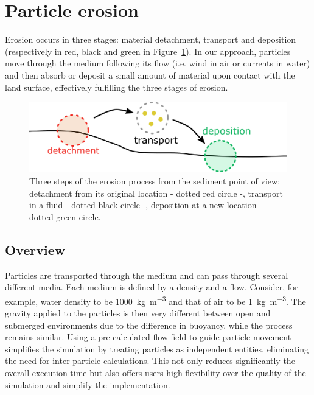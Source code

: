 \section{Particle erosion}%
\label{sec:method}
Erosion occurs in three stages: material detachment, transport and deposition (respectively in red, black and green in Figure~\ref{Erosion-fig:ablation_erosion}). In our approach, particles move through the medium following its flow (i.e. wind in air or currents in water) and then absorb or deposit a small amount of material upon contact with the land surface, effectively fulfilling the three stages of erosion.
\begin{figure}[ht]
\centering
\includegraphics[width=0.95\linewidth]{figures/ablation_erosion.pdf}
\caption{Three steps of the erosion process from the sediment point of view: detachment from its original location - dotted red circle -, transport in a fluid - dotted black circle -, deposition at a new location - dotted green circle.}
\label{Erosion-fig:ablation_erosion}

\end{figure}
\subsection{Overview}
Particles are transported through the medium and can pass through several different media. Each medium is defined by a density and a flow. Consider, for example, water density to be \SI{1000}{\kilogram \per \cubic \meter} and that of air to be \SI{1}{\kilogram \per \cubic \meter}. The gravity applied to the particles is then very different between open and submerged environments due to the difference in buoyancy, while the process remains similar.
Using a pre-calculated flow field to guide particle movement simplifies the simulation by treating particles as independent entities, eliminating the need for inter-particle calculations. This not only reduces significantly the overall execution time but also offers users high flexibility over the quality of the simulation and simplify the implementation. 
